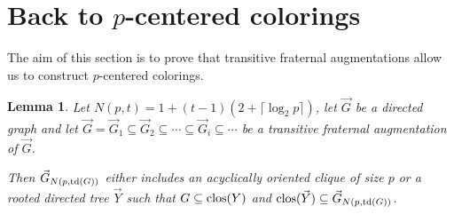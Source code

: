 \documentclass[a4paper]{amsart}
\newtheorem{lemma}[theorem]{Lemma}
\theoremstyle{definition}
\theoremstyle{remark}
\DeclareMathOperator\depth{{\rm td}}
\DeclareMathOperator\clos{{\rm clos}}
\def\vG{\vec{G}}
\def\vY{\vec{Y}}
\begin{document}
\section{Back to $p$-centered colorings}
\label{sec:back}
The aim of this section is to prove that transitive fraternal
augmentations allow us to construct $p$-centered colorings.

\begin{lemma}
\label{lem:pt}
Let $N(p,t)=1+(t-1)(2+\lceil\log_2 p\rceil)$,
let $\vG$ be a directed graph and let
$\vG=\vG_1\subseteq\vG_2\subseteq\dotsb\subseteq \vG_i\subseteq\dotsb$
be a transitive fraternal augmentation of $\vG$.

Then $\vG_{N(p,\depth(G))}$ either includes an acyclically oriented clique of
size $p$ or a rooted directed tree $\vY$ such that $G\subseteq\clos(Y)$
and $\clos(\vY)\subseteq\vG_{N(p,\depth(G))}$.
\end{lemma}
\end{document}
